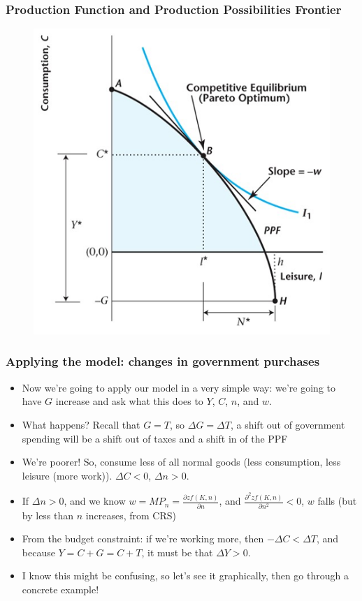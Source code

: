 \documentclass{beamer}
\begin{document}
\begin{frame}
\frametitle[alignment=center]{Production Function and Production Possibilities Frontier}
\begin{figure}
\centering
\includegraphics[scale=0.5]{Figures/W_Fig_5pt5.png}
\end{figure}
\end{frame}


\begin{frame}
\frametitle[alignment=center]{Applying the model:  changes in government purchases}
\begin{itemize}
\item Now we're going to apply our model in a very simple way:  we're going to have $G$ increase and ask what this does to $Y$, $C$, $n$, and $w$.
\bigskip
\item What happens?  Recall that $G=T$, so $\Delta G=\Delta T$, a shift out of government spending will be a shift out of taxes and a shift in of the PPF
\bigskip
\item We're poorer! So, consume less of all normal goods (less consumption, less leisure (more work)).  $\Delta C<0$, $\Delta n>0$. 
\bigskip
\item If $\Delta n >0$, and we know $w=MP_n=\frac{\partial zf(K,n)}{\partial n}$, and $\frac{\partial^2 zf(K,n)}{\partial n^2}<0$, $w$ falls (but by less than $n$ increases, from CRS)
\bigskip
\item From the budget constraint: if we're working more, then $-\Delta C<\Delta T$, and because $Y=C+G=C+T$, it must be that $\Delta Y>0$.  
\bigskip
\item I know this might be confusing, so let's see it graphically, then go through a concrete example!
\end{itemize}
\end{frame}
\end{document}
